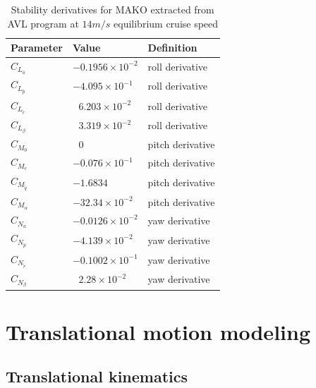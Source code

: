 \begin{table}
\label{arm:momentsMAKO}
\caption{Stability derivatives for MAKO extracted from AVL program at $14 m/s$ equilibrium cruise speed \cite{bronz2016aerodynamic}}
\label{arm:MAKO}
\begin{center}
\begin{tabular}{ ||p{3cm}|p{3cm}|p{3cm}||}\hline
\textbf{Parameter} & \textbf{Value} & \textbf{Definition} \\\hline
$C_{L_a}$                             & $-0.1956 \times 10^{-2}$	   & roll derivative \\\hline
$C_{L_{\tilde{p}}}$                 & $-4.095 \times 10^{-1}$	   & roll derivative \\\hline
$C_{L_{\tilde{r}}} $                 & $\ \ \, 6.203 \times 10^{-2}$     & roll derivative \\\hline
$C_{L_\beta}$                        & $\ \ \, 3.319 \times 10^{-2}$	   & roll derivative \\\hline
$C_{M_0}$ 			     & $\ \ \, 0$  &  pitch derivative \\\hline
$C_{M_e}$ 			     & $-0.076 \times 10^{-1}$  &  pitch derivative \\\hline
$C_{M_{\tilde{q}}} $               & $-1.6834$	                            & pitch derivative \\\hline
$C_{M_\alpha} $                    & $-32.34 \times 10^{-2}$ 	   & pitch derivative \\\hline
$C_{N_a}$                             & $-0.0126 \times 10^{-2}$	   & yaw derivative \\\hline
$C_{N_{\tilde{p}}}$                 & $-4.139 \times 10^{-2}$ 	   & yaw derivative \\\hline
$C_{N_{\tilde{r}}}$                 & $-0.1002 \times 10^{-1}$	   & yaw derivative \\\hline
$C_{N_\beta} $                      & $\ \ \, 2.28 \times 10^{-2}$	   & yaw derivative \\\hline
\end{tabular}
\end{center}
\end{table}



\section{Translational motion modeling}

\subsection{Translational kinematics}


